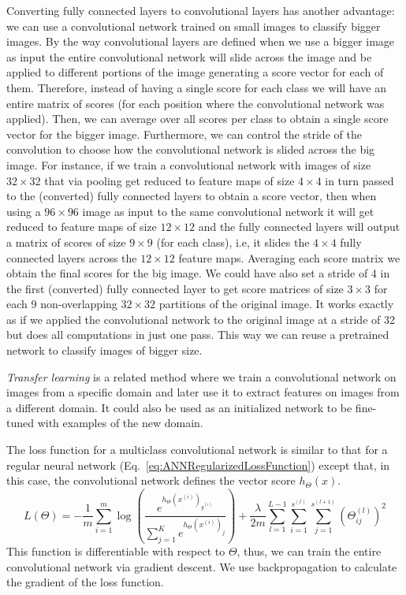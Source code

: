 Converting fully connected layers to convolutional layers has another advantage: we can use a convolutional network trained on small images to classify bigger images. By the way convolutional layers are defined when we use a bigger image as input the entire convolutional network will slide across the image and be applied to different portions of the image generating a score vector for each of them. Therefore, instead of having a single score for each class we will have an entire matrix of scores (for each position where the convolutional network was applied). Then, we can average over all scores per class to obtain a single score vector for the bigger image. Furthermore, we can control the stride of the convolution to choose how the convolutional network is slided across the big image.
For instance, if we train a convolutional network with images of size $32\times 32$ that via pooling get reduced to feature maps of size $4\times 4$ in turn passed to the (converted) fully connected layers to obtain a score vector, then when using a $96\times 96$ image as input to the same convolutional network it will get reduced to feature maps of size $12 \times 12$ and the fully connected layers will output a matrix of scores of size $9\times 9$ (for each class), i.e, it slides the $4\times 4$ fully connected layers across the $12\times 12$ feature maps. Averaging each score matrix we obtain the final scores for the big image. We could have also  set a stride of 4 in the first (converted) fully connected layer to get score matrices of size $3\times 3$ for each 9 non-overlapping $32\times 32$ partitions of the original image. It works exactly as if we applied the convolutional network to the original image at a stride of 32 but does all computations in just one pass. This way we can reuse a pretrained network to classify images of bigger size. 

\emph{Transfer learning} is a related method where we train a convolutional network on images from a specific domain and later use it to extract features on images from a different domain. It could also be used as an initialized network  to be fine-tuned with examples of the new domain.

The loss function for a multiclass convolutional network is similar to that for a regular neural network (Eq.~\ref{eq:ANNRegularizedLossFunction}) except that, in this case, the convolutional network defines the vector score $h_\Theta(x)$.
\begin{equation}
	L(\Theta) = -\frac{1}{m} \sum_{i=1}^m \log \left ( \frac{ e^{h_\Theta(x^{(i)})_{y^{(i)}}} }{ \sum_{j=1}^K e^{ h_\Theta (x^{(i)})_j} } \right ) + \frac{\lambda}{2m}\sum_{l=1}^{L-1}\sum_{i=1}^{s^{(l)}}\sum_{j=1}^{s^{(l+1)}} \left(\Theta^{(l)}_{ij}\right)^2
	\label{eq:ConvNetLossFunction}
\end{equation}
This function is differentiable with respect to $\Theta$, thus, we can train the entire convolutional network via gradient descent. We use backpropagation to calculate the gradient of the loss function.

